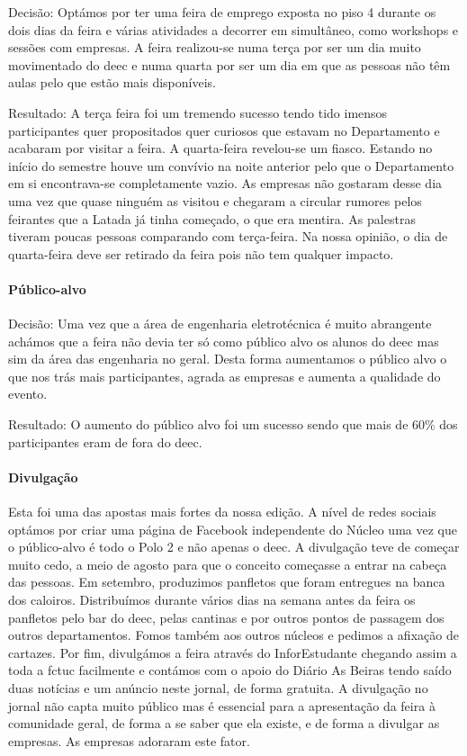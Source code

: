 Decisão: Optámos por ter uma feira de emprego exposta no piso 4 durante os dois dias da feira e várias atividades a decorrer em simultâneo, como workshops e sessões com empresas. A feira realizou-se numa terça por ser um dia muito movimentado do \acrshort{deec} e numa quarta por ser um dia em que as pessoas não têm aulas pelo que estão mais disponíveis. 

Resultado: A terça feira foi um tremendo sucesso tendo tido imensos participantes quer propositados quer curiosos que estavam no Departamento e acabaram por visitar a feira. A quarta-feira revelou-se um fiasco. Estando no início do semestre houve um convívio na noite anterior pelo que o Departamento em si encontrava-se completamente vazio. As empresas não gostaram desse dia uma vez que quase ninguém as visitou e chegaram a circular rumores pelos feirantes que a Latada já tinha começado, o que era mentira. As palestras tiveram poucas pessoas comparando com terça-feira. Na nossa opinião, o dia de quarta-feira deve ser retirado da feira pois não tem qualquer impacto.  

\paragraph{Público-alvo}

Decisão: Uma vez que a área de engenharia eletrotécnica é muito abrangente achámos que a feira não devia ter só como público alvo os alunos do \acrshort{deec} mas sim da área das engenharia no geral. Desta forma aumentamos o público alvo o que nos trás mais participantes, agrada as empresas e aumenta a qualidade do evento. 

Resultado: O aumento do público alvo foi um sucesso sendo que mais de 60\% dos participantes eram de fora do \acrshort{deec}.  

\paragraph{Divulgação}
Esta foi uma das apostas mais fortes da nossa edição. A nível de redes sociais optámos por criar uma página de Facebook independente do Núcleo uma vez que o público-alvo é todo o Polo 2 e não apenas o \acrshort{deec}. A divulgação teve de começar muito cedo, a meio de agosto para que o conceito começasse a entrar na cabeça das pessoas. Em setembro, produzimos panfletos que foram entregues na banca dos caloiros. Distribuímos durante vários dias na semana antes da feira os panfletos pelo bar do \acrshort{deec}, pelas cantinas e por outros pontos de passagem dos outros departamentos. Fomos também aos outros núcleos e pedimos a afixação de cartazes. Por fim, divulgámos a feira através do InforEstudante chegando assim a toda a \acrshort{fctuc} facilmente e contámos com o apoio do Diário As Beiras tendo saído duas notícias e um anúncio neste jornal, de forma gratuita. A divulgação no jornal não capta muito público mas é essencial para a apresentação da feira à comunidade geral, de forma a se saber que ela existe, e de forma a divulgar as empresas. As empresas adoraram este fator. 

